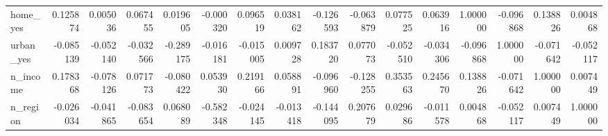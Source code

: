 \begin{tabu}{lrrrrrrrrrrrrrrr}
home\_yes & 0.125874 & 0.005036 & 0.067455 & 0.019605 & -0.000320 & 0.096519 & 0.038162 & -0.126593 & -0.063879 & 0.077525 & 0.063916 & 1.000000 & -0.096868 & 0.138826 & 0.004868 \\
urban\_yes & -0.085139 & -0.052140 & -0.032566 & -0.289175 & -0.016181 & -0.015005 & 0.009728 & 0.183720 & 0.077073 & -0.052510 & -0.034306 & -0.096868 & 1.000000 & -0.071642 & -0.052117 \\
n\_income & 0.178368 & -0.078126 & 0.071773 & -0.080422 & 0.053930 & 0.219166 & 0.058891 & -0.096960 & -0.128255 & 0.353563 & 0.245670 & 0.138826 & -0.071642 & 1.000000 & 0.007449 \\
n\_region & -0.026034 & -0.041865 & -0.083654 & 0.068089 & -0.582348 & -0.024145 & -0.013418 & -0.144095 & 0.207679 & 0.029686 & -0.011578 & 0.004868 & -0.052117 & 0.007449 & 1.000000 \\
\bottomrule
\end{tabu}